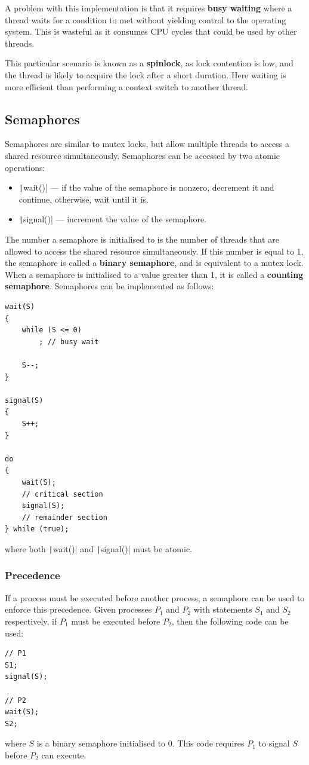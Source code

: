 \documentclass{article}
\begin{document}
A problem with this implementation is that it requires \textbf{busy
waiting} where a thread waits for a condition to met without yielding
control to the operating system. This is wasteful as it consumes CPU
cycles that could be used by other threads.

This particular scenario is known as a \textbf{spinlock}, as lock
contention is low, and the thread is likely to acquire the lock after a
short duration. Here waiting is more efficient than performing a
context switch to another thread.
\subsection{Semaphores}
Semaphores are similar to mutex locks, but allow multiple threads to
access a shared resource simultaneously. Semaphores can be accessed by
two atomic operations:
\begin{itemize}
    \item \texttt|wait()| --- if the value of the semaphore is
          nonzero, decrement it and continue, otherwise, wait until it
          is.
    \item \texttt|signal()| --- increment the value of the
          semaphore.
\end{itemize}
The number a semaphore is initialised to is the number of threads that
are allowed to access the shared resource simultaneously. If this number
is equal to 1, the semaphore is called a \textbf{binary semaphore}, and
is equivalent to a mutex lock. When a semaphore is initialised to a value
greater than 1, it is called a \textbf{counting semaphore}. Semaphores
can be implemented as follows:
\begin{verbatim}
wait(S)
{
    while (S <= 0)
        ; // busy wait

    S--;
}

signal(S)
{
    S++;
}

do
{
    wait(S);
    // critical section
    signal(S);
    // remainder section
} while (true);
\end{verbatim}
where both \texttt|wait()| and \texttt|signal()| must be
atomic.
\subsubsection{Precedence}
If a process must be executed before another process, a semaphore can
be used to enforce this precedence. Given processes \(P_1\) and \(P_2\)
with statements \(S_1\) and \(S_2\) respectively, if \(P_1\) must be
executed before \(P_2\), then the following code can be used:
\begin{verbatim}
// P1
S1;
signal(S);

// P2
wait(S);
S2;
\end{verbatim}
where \(S\) is a binary semaphore initialised to 0. This code requires
\(P_1\) to signal \(S\) before \(P_2\) can execute.
\end{document}

